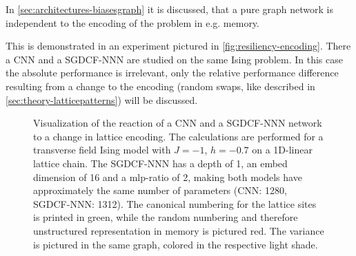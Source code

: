 In \autoref{sec:architectures-biasesgraph} it is discussed, that a pure graph network is independent to the encoding of the problem in e.g. memory.

This is demonstrated in an experiment pictured in \autoref{fig:resiliency-encoding}.
There a CNN and a SGDCF-NNN are studied on the same Ising problem.
In this case the absolute performance is irrelevant, only the relative performance difference resulting from a change to the encoding (random swaps, like described in \autoref{sec:theory-latticepatterns}) will be discussed. 

\begin{figure}[htbp]
    \centering
    \caption{
        Visualization of the reaction of a CNN and a SGDCF-NNN network to a change in lattice encoding.
        The calculations are performed for a transverse field Ising model with $J = -1$, $h=-0.7$ on a 1D-linear lattice chain.
        The SGDCF-NNN has a depth of 1, an embed dimension of 16 and a mlp-ratio of 2, making both models have approximately the same number of parameters (CNN: 1280, SGDCF-NNN: 1312).
        The canonical numbering for the lattice sites is printed in green, while the random numbering and therefore unstructured representation in memory is pictured red. 
        The variance is pictured in the same graph, colored in the respective light shade.
    }
    \label{fig:resiliency-encoding}
\end{figure}


